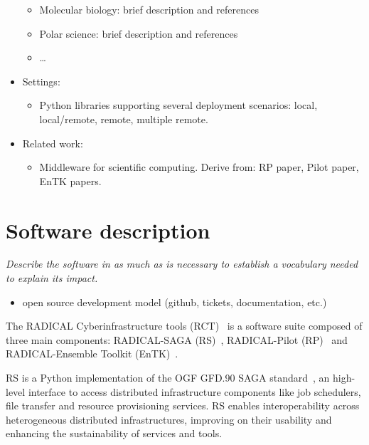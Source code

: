 \documentclass[preprint,12pt, a4paper]{elsarticle}
\begin{document}
\begin{itemize}
\begin{itemize}
      \item Molecular biology: brief description and references
      \item Polar science: brief description and references
      \item \ldots
    \end{itemize}
  \item Settings:
    \begin{itemize}
      \item Python libraries supporting several deployment scenarios: local,
      local/remote, remote, multiple remote.
    \end{itemize}
  \item Related work:
    \begin{itemize}
      \item Middleware for scientific computing. Derive from: RP paper, Pilot
      paper, EnTK papers.
    \end{itemize}
\end{itemize}


\section{Software description}\label{sec:description}

{\em Describe the software in as much as is necessary to establish a
vocabulary needed to explain its impact.}

\begin{itemize}
  \item open source development model (github, tickets, documentation,
  etc.)
\end{itemize}

The RADICAL Cyberinfrastructure tools (RCT)~\cite{web-rct} is a software
suite composed of three main components: RADICAL-SAGA
(RS)~\cite{merzky2015saga}, RADICAL-Pilot (RP)~\cite{merzky2018using} and
RADICAL-Ensemble Toolkit (EnTK)~\cite{balasubramanian2018harnessing}.

RS is a Python implementation of the OGF GFD.90 SAGA
standard~\cite{goodale2006saga}, an high-level interface to access
distributed infrastructure components like job schedulers, file transfer and
resource provisioning services. RS enables interoperability across
heterogeneous distributed infrastructures, improving on their usability and
enhancing the sustainability of services and tools.
\end{document}
